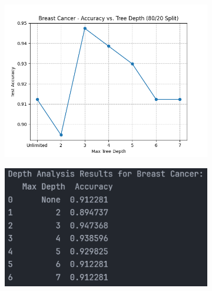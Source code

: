 \begin{figure}[H]
	\centering
	\begin{subfigure}{0.45\textwidth}
		\centering
		\includegraphics[width=\textwidth]{imgs/accuracy_vs_depth_breast_cancer.png}
	\end{subfigure}
	\hfill
	\begin{subfigure}{0.45\textwidth}
		\centering
		\includegraphics[width=\textwidth]{imgs/accuracy_vs_depth_breast_cancer__analysis.png}
	\end{subfigure}
\end{figure}

